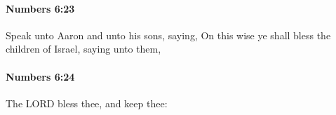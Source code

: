 		\paragraph{Numbers 6:23} %
			\label{NUMBERS-6-23}

			Speak unto Aaron and unto his sons, saying, On this wise ye shall bless the children of Israel, saying unto them,


		\paragraph{Numbers 6:24} %
			\label{NUMBERS-6-24}

			The LORD bless thee, and keep thee:


